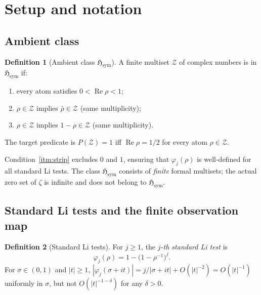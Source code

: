 \documentclass[12pt]{amsart}
\theoremstyle{definition}
\newtheorem{definition}{Definition}[section]
\theoremstyle{remark}
\theoremstyle{plain}
\newcommand{\Hsym}{\mathfrak{H}_{\mathrm{sym}}}
\newcommand{\re}{\operatorname{Re}}
\begin{document}
\section{Setup and notation}
\label{sec:setup}

\subsection{Ambient class}

\begin{definition}[Ambient class $\Hsym$]
\label{def:ambient}
A finite multiset $\mathcal{Z}$ of complex numbers is in $\Hsym$ if:
\begin{enumerate}[label=\textup{(S\arabic*)}]
  \item\label{itm:strip} every atom satisfies $0 < \re\rho < 1$;
  \item\label{itm:conj} $\rho \in \mathcal{Z}$ implies $\bar\rho \in \mathcal{Z}$
    (same multiplicity);
  \item $\rho \in \mathcal{Z}$ implies $1-\rho \in \mathcal{Z}$
    (same multiplicity).
\end{enumerate}
The target predicate is $P(\mathcal{Z}) = 1$ iff $\re\rho = 1/2$ for every
atom $\rho \in \mathcal{Z}$.
\end{definition}

Condition~\ref{itm:strip} excludes $0$ and $1$, ensuring that
$\varphi_j(\rho)$ is well-defined for all standard Li tests.
The class $\Hsym$ consists of \emph{finite} formal multisets; the actual
zero set of $\zeta$ is infinite and does not belong to $\Hsym$.

\subsection{Standard Li tests and the finite observation map}

\begin{definition}[Standard Li tests]
\label{def:Listd}
For $j \geq 1$, the \emph{$j$-th standard Li test} is
\[
  \varphi_j(\rho) = 1 - \bigl(1 - \rho^{-1}\bigr)^j.
\]
For $\sigma\in(0,1)$ and $|t|\geq 1$,
$|\varphi_j(\sigma+it)| = j/|\sigma+it| + O(|t|^{-2}) = O(|t|^{-1})$
uniformly in $\sigma$, but not $O(|t|^{-1-\delta})$ for any $\delta>0$.
\end{definition}
\end{document}
